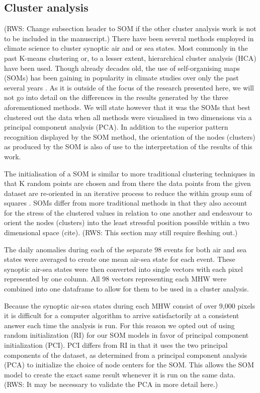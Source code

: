 \documentclass[a4paper,10pt,review]{elsarticle}
\begin{document}
\subsection{Cluster analysis}
(RWS: Change subsection header to SOM if the other cluster analysis work is not to be included in the manuscript.)
There have been several methods employed in climate science to cluster synoptic air and or sea states. Most commonly in the past K-means clustering \citep[e.g.]{Corte-Real1998, Burrough2001, Kumar2011} or, to a lesser extent, hierarchical cluster analysis (HCA) \citep[e.g.][]{Unal2003} have been used. Though already decades old, the use of self-organising maps (SOMs) has been gaining in popularity in climate studies over only the past several years \citep[e.g.][]{Cavazos2000, Hewitson2002, Morioka2010}. As it is outside of the focus of the research presented here, we will not go into detail on the differences in the results generated by the three aforementioned methods. We will state however that it was the SOMs that best clustered out the data when all methods were visualised in two dimensions via a principal component analysis (PCA). In addition to the superior pattern recognition displayed by the SOM method, the orientation of the nodes (clusters) as produced by the SOM is also of use to the interpretation of the results of this work.

The initialisation of a SOM is similar to more traditional clustering techniques in that K random points are chosen and from there the data points from the given dataset are re-oriented in an iterative process to reduce the within group sum of squares \citep{Jain2010}. SOMs differ from more traditional methods in that they also account for the stress of the clustered values in relation to one another and endeavour to orient the nodes (clusters) into the least stressful position possible within a two dimensional space (cite). (RWS: This section may still require fleshing out.)

The daily anomalies during each of the separate 98 events for both air and sea states were averaged to create one mean air-sea state for each event. These synoptic air-sea states were then converted into single vectors with each pixel represented by one column. All 98 vectors representing each MHW were combined into one dataframe to allow for them to be used in a cluster analysis.

Because the synoptic air-sea states during each MHW consist of over 9,000 pixels it is difficult for a computer algorithm to arrive satisfactorily at a consistent answer each time the analysis is run. For this reason we opted out of using random initialization (RI) for our SOM models in favor of principal component initialization (PCI). PCI differs from RI in that it uses the two principal components of the dataset, as determined from a principal component analysis (PCA) to initialize the choice of node centers for the SOM. This allows the SOM model to create the exact same result whenever it is run on the same data. (RWS: It may be necessary to validate the PCA in more detail here.)
\end{document}
